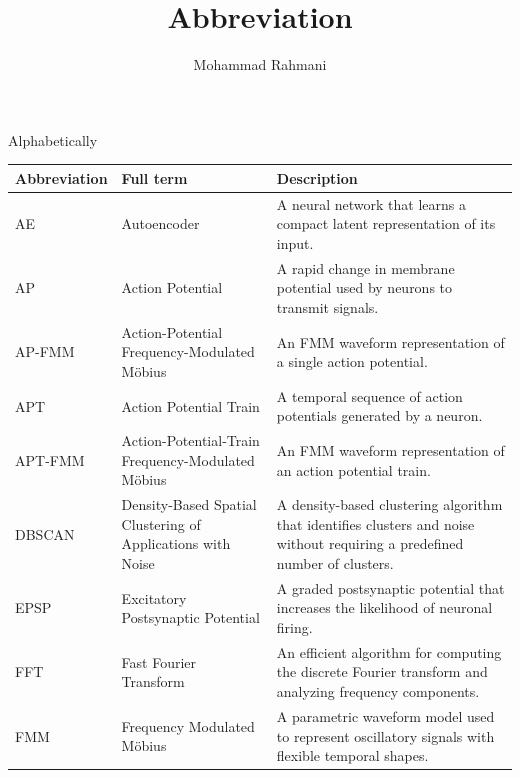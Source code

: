 \documentclass[a4paper]{article}
\title{Abbreviation}
\date{}
\author{Mohammad Rahmani}
\begin{document}
Alphabetically
\begin{table}[H]

\centering

\small

\setlength{\tabcolsep}{4pt}

\begin{tabular}{p{} p{} p{}}

\hline

\textbf{Abbreviation} & \textbf{Full term} & \textbf{Description} \\

\hline

AE
& Autoencoder
& A neural network that learns a compact latent representation of its input. \\
\hline

AP
& Action Potential
& A rapid change in membrane potential used by neurons to transmit signals. \\
\hline

AP-FMM
& Action-Potential Frequency-Modulated M\"obius
& An FMM waveform representation of a single action potential. \\
\hline

APT
& Action Potential Train
& A temporal sequence of action potentials generated by a neuron. \\
\hline

APT-FMM
& Action-Potential-Train Frequency-Modulated M\"obius
& An FMM waveform representation of an action potential train. \\
\hline

DBSCAN
& Density-Based Spatial Clustering of Applications with Noise
& A density-based clustering algorithm that identifies clusters and noise without requiring a predefined number of clusters. \\
\hline

EPSP
& Excitatory Postsynaptic Potential
& A graded postsynaptic potential that increases the likelihood of neuronal firing. \\
\hline

FFT
& Fast Fourier Transform
& An efficient algorithm for computing the discrete Fourier transform and analyzing frequency components. \\
\hline

FMM
& Frequency Modulated M\"obius
& A parametric waveform model used to represent oscillatory signals with flexible temporal shapes. \\
\hline


\end{tabular}
\end{table}
\end{document}
